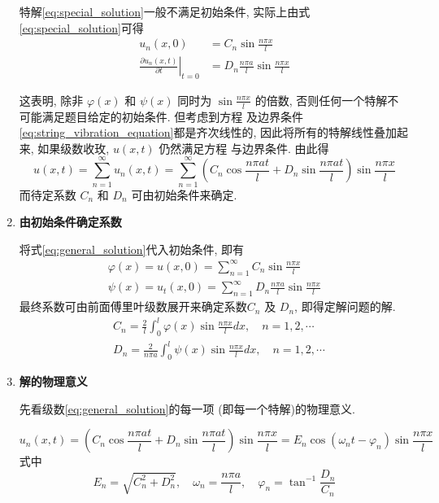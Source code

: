 \begin{enumerate}
    特解\eqref{eq:special_solution}一般不满足初始条件, 实际上由式\eqref{eq:special_solution}可得 
    $$
    \begin{aligned}
    u_{n}(x, 0) & =C_{n} \sin \frac{n \pi x}{l} \\
    \left.\frac{\partial u_{n}(x, t)}{\partial t}\right|_{t=0} & =D_{n} \frac{n \pi a}{l} \sin \frac{n \pi x}{l}
    \end{aligned}
    $$

    这表明, 除非 $\varphi(x)$ 和 $\psi(x)$ 同时为 $\sin \frac{n \pi x}{l}$ 的倍数,
     否则任何一个特解不可能满足题目给定的初始条件. 
     但考虑到方程  及边界条件\eqref{eq:string_vibration_equation}都是齐次线性的, 
     因此将所有的特解线性叠加起来, 如果级数收玫, $u(x, t)$ 仍然满足方程 与边界条件. 由此得
    \begin{equation}
        u(x, t)=\sum_{n=1}^{\infty} u_{n}(x, t)=
        \sum_{n=1}^{\infty}\left(C_{n} \cos \frac{n \pi a t}{l}+
        D_{n} \sin \frac{n \pi a t}{l}\right) \sin \frac{n \pi x}{l}
        \label{eq:general_solution}
    \end{equation}
    而待定系数 $C_{n}$ 和 $D_{n}$ 可由初始条件来确定.
    

    \item \textbf{由初始条件确定系数} 
    
        将式\eqref{eq:general_solution}代入初始条件, 即有
        $$
        \begin{gathered}
        \varphi(x)=u(x, 0)=\sum_{n=1}^{\infty} C_{n} \sin \frac{n \pi x}{l} \\
        \psi(x)=u_{t}(x, 0)=\sum_{n=1}^{\infty} D_{n} \frac{n \pi a}{l} \sin \frac{n \pi x}{l}
        \end{gathered}
        $$
        最终系数可由前面傅里叶级数展开来确定系数$C_{n}$ 及 $D_{n}$, 即得定解问题的解.
        $$
        \begin{aligned}
        & C_{n}=\frac{2}{l} \int_{0}^{l} \varphi(x) \sin \frac{n \pi x}{l} d x, \quad n=1,2, \cdots \\
        & D_{n}=\frac{2}{n \pi a} \int_{0}^{l} \psi(x) \sin \frac{n \pi x}{l} d x, \quad n=1,2, \cdots
        \end{aligned}
        $$


        \item \textbf{解的物理意义}
        
        先看级数\eqref{eq:general_solution}的每一项 (即每一个特解)的物理意义.

        \begin{equation}
            u_{n}(x, t)=\left(C_{n} \cos \frac{n \pi a t}{l}+D_{n} \sin \frac{n \pi a t}{l}\right) \sin \frac{n \pi x}{l}
            =E_{n} \cos \left(\omega_{n} t-\varphi_{n}\right) \sin \frac{n \pi x}{l}
            \label{eq:solution_2}
        \end{equation}    
        式中
        $$
        E_{n}=\sqrt{C_{n}^{2}+D_{n}^{2}}, 
            \quad \omega_{n}=\frac{n \pi a}{l}, 
            \quad \varphi_{n}=\tan ^{-1} \frac{D_{n}}{C_{n}}
        $$
        

\end{enumerate}
